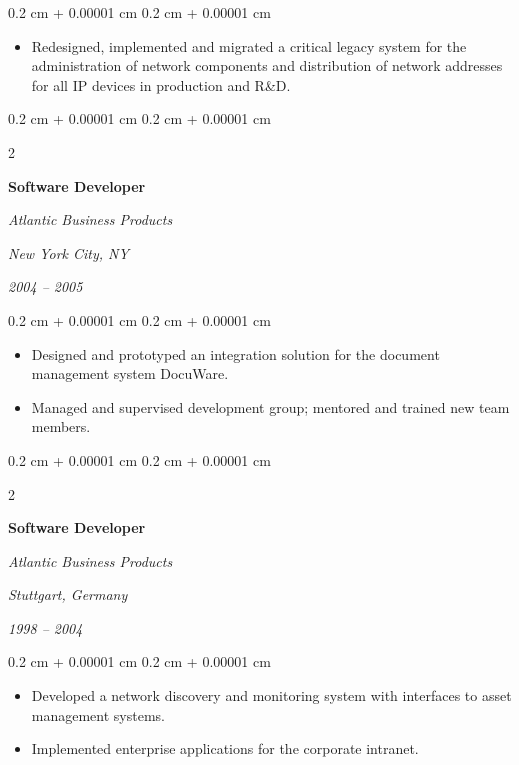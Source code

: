 \documentclass[10pt, a4paper]{article}
\newenvironment{highlights}{
    \begin{itemize}[
        topsep=0.10 cm,
        parsep=0.10 cm,
        partopsep=0pt,
        itemsep=0pt,
        leftmargin=0.4 cm + 10pt
    ]
}{
    \end{itemize}
} %
\newenvironment{onecolentry}{
    \begin{adjustwidth}{
        0.2 cm + 0.00001 cm
    }{
        0.2 cm + 0.00001 cm
    }
}{
    \end{adjustwidth}
} %
\newenvironment{twocolentry}[2][]{
    \onecolentry
    \def\secondColumn{#2}
    \setcolumnwidth{\fill, 8 cm}
    \begin{paracol}{2}
}{
    \switchcolumn \raggedleft \secondColumn
    \end{paracol}
    \endonecolentry
} %
\begin{document}
\vspace{0.10 cm}
\begin{onecolentry}
    \begin{highlights}
        \item Redesigned, implemented and migrated a critical legacy system for the administration of network components and distribution of network addresses for all IP devices in production and R\&D.
    \end{highlights}
\end{onecolentry}

\vspace{0.20 cm}



%
%
\begin{twocolentry}{
        \textit{New York City, NY}

        \textit{2004 – 2005}}
    \textbf{Software Developer}

    \textit{Atlantic Business Products}
\end{twocolentry}

\vspace{0.10 cm}
\begin{onecolentry}
    \begin{highlights}
        \item Designed and prototyped an integration solution for the document management system DocuWare.
        \item Managed and supervised development group; mentored and trained new team members.
    \end{highlights}
\end{onecolentry}

\vspace{0.20 cm}



%
%
\begin{twocolentry}{
        \textit{Stuttgart, Germany}

        \textit{1998 – 2004}}
    \textbf{Software Developer}

    \textit{Atlantic Business Products}
\end{twocolentry}

\vspace{0.10 cm}
\begin{onecolentry}
    \begin{highlights}
        \item Developed a network discovery and monitoring system with interfaces to asset management systems.
        \item Implemented enterprise applications for the corporate intranet.
    \end{highlights}
\end{onecolentry}
\end{document}
